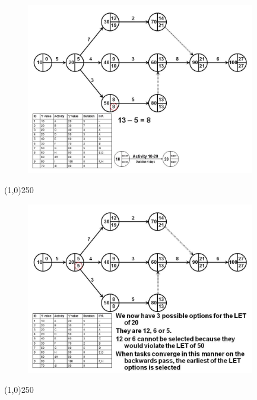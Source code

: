 \begin{frame}
\begin{figure}
	\centering
		\includegraphics[width = 10.0cm]{oldnotes/Slide118.jpg}
\end{figure}
\end{frame}
\begin{center}\line(1,0){250}\end{center}


\begin{frame}
\begin{figure}
	\centering
		\includegraphics[width = 10.0cm]{oldnotes/Slide119.jpg}
\end{figure}
\end{frame}
\begin{center}\line(1,0){250}\end{center}


